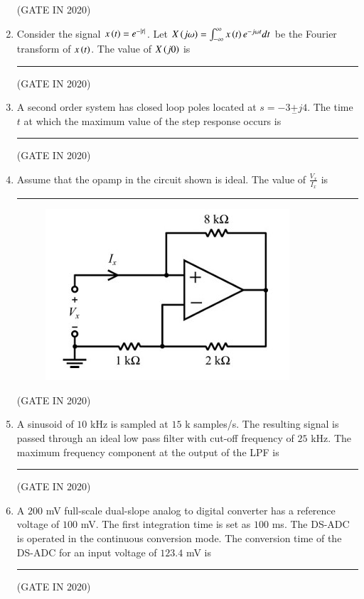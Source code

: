 \documentclass[journal,12pt,onecolumn]{IEEEtran}
\theoremstyle{remark}
\begin{document}
\begin{enumerate}
\hfill{(GATE IN 2020)}

\item Consider the signal $x\left(t\right) = e^{-\left\vert t\right\vert}$. Let $X\left(j\omega\right) = \int_{-\infty}^{\infty} x\left(t\right) e^{-j\omega t} dt$ be the Fourier transform of $x\left(t\right)$. The value of $X\left(j0\right)$ is \rule{2cm}{0.4pt}

\hfill{(GATE IN 2020)}

\item A second order system has closed loop poles located at 
$s = -3 \underset{-}{+} j4$. The time $t$ at which the maximum value of the step response occurs  is \rule{2cm}{0.4pt}

\hfill{(GATE IN 2020)}

\item Assume that the opamp in the circuit shown is ideal. The value of $\frac{V_x}{I_x}$  is \rule{2cm}{0.4pt}
\begin{figure}[H]
\centering
\includegraphics[width=0.4\columnwidth]{figs/q11.jpg}
\caption*{}
\label{fig:q11}
\end{figure}

\hfill{(GATE IN 2020)}

\item A sinusoid of $10$ kHz is sampled at $15$ k samples/s. The resulting signal is passed through an ideal low pass filter  with cut-off frequency of $25$ kHz. The maximum frequency component at the output of the LPF  is \rule{2cm}{0.4pt}

\hfill{(GATE IN 2020)}

\item A $200$ mV full-scale dual-slope analog to digital converter  has a reference voltage of $100$ mV. The first integration time is set as $100$ ms. The DS-ADC is operated in the continuous conversion mode. The conversion time of the DS-ADC for an input voltage of $123.4$ mV  is \rule{2cm}{0.4pt}

\hfill{(GATE IN 2020)}


\end{enumerate}
\end{document}
